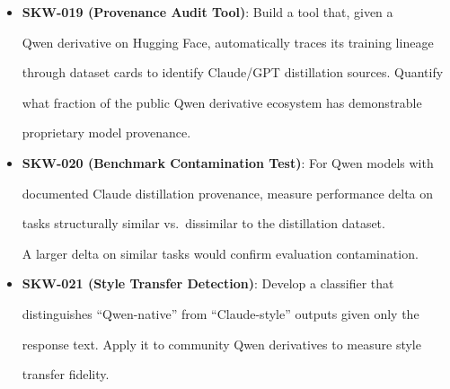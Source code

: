 \begin{itemize}





  \item \textbf{SKW-019 (Provenance Audit Tool)}: Build a tool that, given a





    Qwen derivative on Hugging Face, automatically traces its training lineage





    through dataset cards to identify Claude/GPT distillation sources. Quantify





    what fraction of the public Qwen derivative ecosystem has demonstrable





    proprietary model provenance.





  \item \textbf{SKW-020 (Benchmark Contamination Test)}: For Qwen models with





    documented Claude distillation provenance, measure performance delta on





    tasks structurally similar vs.\ dissimilar to the distillation dataset.





    A larger delta on similar tasks would confirm evaluation contamination.





  \item \textbf{SKW-021 (Style Transfer Detection)}: Develop a classifier that





    distinguishes ``Qwen-native'' from ``Claude-style'' outputs given only the





    response text. Apply it to community Qwen derivatives to measure style





    transfer fidelity.





\end{itemize}











